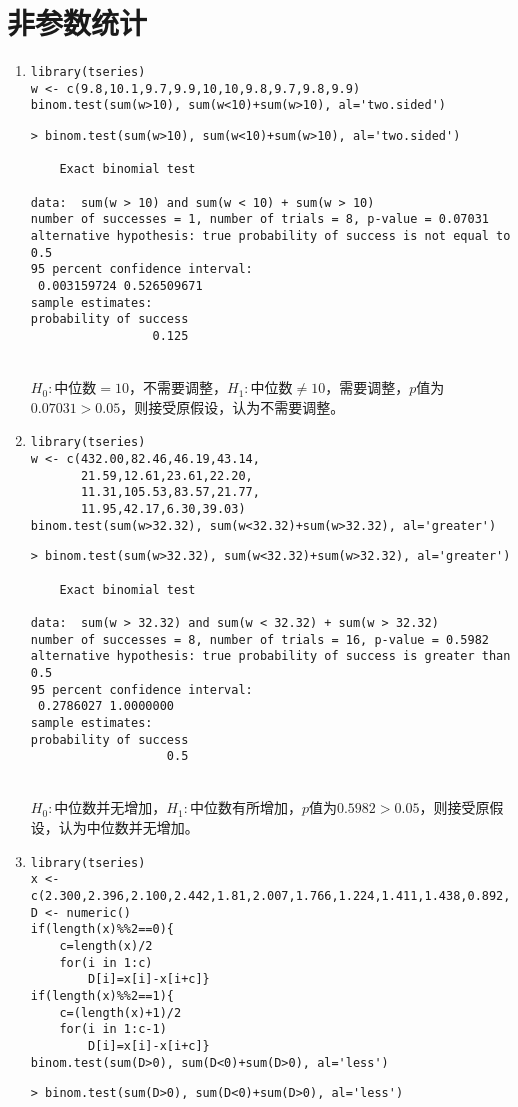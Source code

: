 \section{非参数统计}
    \begin{enumerate}
        \item
        \code
\begin{lstlisting}
library(tseries)
w <- c(9.8,10.1,9.7,9.9,10,10,9.8,9.7,9.8,9.9)
binom.test(sum(w>10), sum(w<10)+sum(w>10), al='two.sided')
\end{lstlisting}
        \out
\begin{lstlisting}
> binom.test(sum(w>10), sum(w<10)+sum(w>10), al='two.sided')

	Exact binomial test

data:  sum(w > 10) and sum(w < 10) + sum(w > 10)
number of successes = 1, number of trials = 8, p-value = 0.07031
alternative hypothesis: true probability of success is not equal to 0.5
95 percent confidence interval:
 0.003159724 0.526509671
sample estimates:
probability of success 
                 0.125
\end{lstlisting}
        \summary\\
        $H_0:$中位数$=10$，不需要调整，$H_1:$中位数$\neq 10$，需要调整，$p$值为$0.07031>0.05$，则接受原假设，认为不需要调整。
        \item
        \code
\begin{lstlisting}
library(tseries)
w <- c(432.00,82.46,46.19,43.14,
       21.59,12.61,23.61,22.20,
       11.31,105.53,83.57,21.77,
       11.95,42.17,6.30,39.03)
binom.test(sum(w>32.32), sum(w<32.32)+sum(w>32.32), al='greater')
\end{lstlisting}
        \out
\begin{lstlisting}
> binom.test(sum(w>32.32), sum(w<32.32)+sum(w>32.32), al='greater')

	Exact binomial test

data:  sum(w > 32.32) and sum(w < 32.32) + sum(w > 32.32)
number of successes = 8, number of trials = 16, p-value = 0.5982
alternative hypothesis: true probability of success is greater than 0.5
95 percent confidence interval:
 0.2786027 1.0000000
sample estimates:
probability of success 
                   0.5 
\end{lstlisting}
        \summary\\
        $H_0:$中位数并无增加，$H_1:$中位数有所增加，$p$值为$0.5982>0.05$，则接受原假设，认为中位数并无增加。
        \item
        \code
\begin{lstlisting}
library(tseries)
x <- c(2.300,2.396,2.100,2.442,1.81,2.007,1.766,1.224,1.411,1.438,0.892,1.167)
D <- numeric()
if(length(x)%%2==0){
	c=length(x)/2
	for(i in 1:c)
		D[i]=x[i]-x[i+c]}
if(length(x)%%2==1){
	c=(length(x)+1)/2
	for(i in 1:c-1)
		D[i]=x[i]-x[i+c]}
binom.test(sum(D>0), sum(D<0)+sum(D>0), al='less')
\end{lstlisting}
        \out
\begin{lstlisting}
> binom.test(sum(D>0), sum(D<0)+sum(D>0), al='less')


\end{lstlisting}
\end{enumerate}
